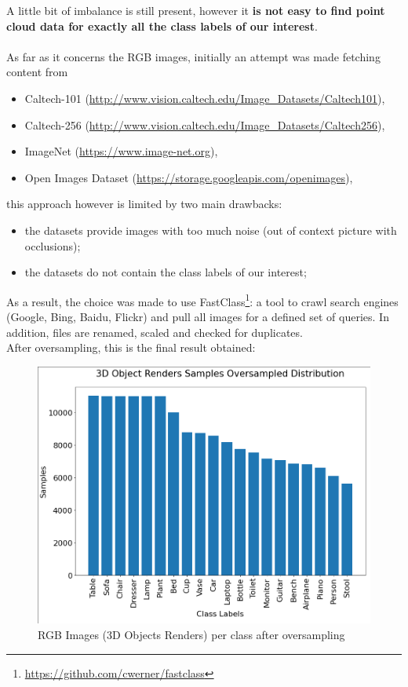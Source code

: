 \documentclass[11pt,a4paper]{article}
\begin{document}
\noindent
A little bit of imbalance is still present, however it \textbf{is not easy to find point cloud data for exactly all the class labels of our interest}.\\
\\
As far as it concerns the RGB images, initially an attempt was made fetching content from
\begin{itemize}
    \item Caltech-101 (\url{http://www.vision.caltech.edu/Image_Datasets/Caltech101}),
    \item Caltech-256 (\url{http://www.vision.caltech.edu/Image_Datasets/Caltech256}),
    \item ImageNet (\url{https://www.image-net.org}),
    \item Open Images Dataset (\url{https://storage.googleapis.com/openimages}),
\end{itemize}
this approach however is limited by two main drawbacks:
\begin{itemize}
    \item the datasets provide images with too much noise (out of context picture with occlusions);
    \item the datasets do not contain the class labels of our interest;
\end{itemize}
As a result, the choice was made to use FastClass\footnote{\url{https://github.com/cwerner/fastclass}}: a tool to crawl search engines (Google, Bing, Baidu, Flickr) and pull all images for a defined set of queries. In addition, files are renamed, scaled and checked for duplicates.\\
After oversampling, this is the final result obtained:
\begin{figure}[H]
    \centering
    \includegraphics[scale=0.35]{imgs/3d-object-renders-crawling-oversampled-distribution.png}
    \caption{RGB Images (3D Objects Renders) per class after oversampling}
    \label{rgb-images-balancing}
\end{figure}
\end{document}
